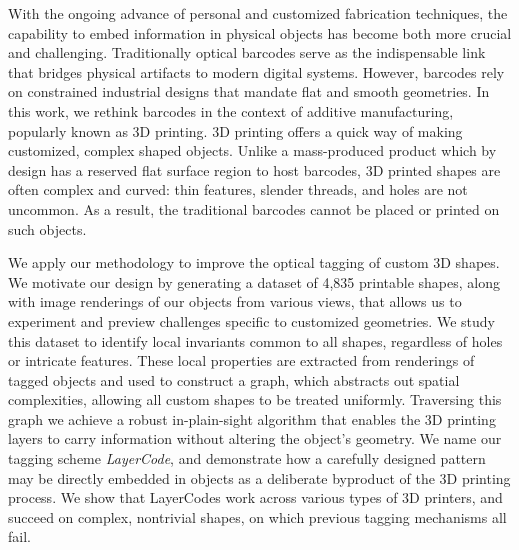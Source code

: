 \documentclass[12pt]{report}
\newcommand{\ft}{4,835 }
\begin{document}
\vspace{-9mm}
With the ongoing advance of personal and customized fabrication techniques, 
the capability to embed information in physical objects has become both more crucial and challenging. 
Traditionally optical barcodes serve as the indispensable link that bridges
physical artifacts to modern digital systems.
However, barcodes rely on constrained industrial designs that mandate flat and smooth geometries.
In this work, we rethink barcodes in the context of additive manufacturing,
popularly known as 3D printing. 3D printing offers a quick way of making 
customized, complex shaped objects.
Unlike a mass-produced product which by design has a reserved flat surface region
to host barcodes, 3D printed shapes are often complex and curved: 
thin features, slender threads, and holes are not uncommon.
As a result, the traditional barcodes cannot be placed or printed on such objects.

We apply our methodology to improve the optical tagging of custom 3D shapes.
We motivate our design by generating a dataset of \ft printable shapes, 
along with image renderings of our objects from various views,
that allows us to experiment and preview challenges specific to customized geometries.
We study this dataset to identify local invariants common to all shapes,
regardless of holes or intricate features.
These local properties are extracted from renderings of tagged objects and used to construct a graph,
which abstracts out spatial complexities, allowing all custom shapes to be treated uniformly.
Traversing this graph we achieve a robust in-plain-sight algorithm 
that enables the 3D printing layers to carry information without altering the object's geometry.
We name our tagging scheme \emph{LayerCode}, and demonstrate how a carefully designed pattern 
may be directly embedded in objects as a deliberate byproduct of the 3D printing process. 
We show that LayerCodes work across various types of 3D printers, 
and succeed on complex, nontrivial shapes, on which previous tagging mechanisms all fail. 
\end{document}
